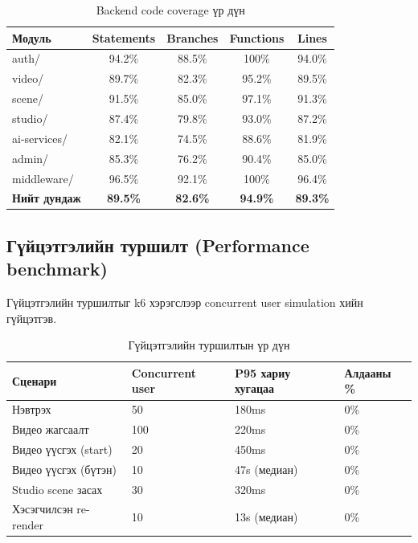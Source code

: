 \begin{table}[H]
\centering
\label{tab:coverage}
\begin{tabular}{|l|c|c|c|c|}
\hline
\textbf{Модуль} & \textbf{Statements} & \textbf{Branches} & \textbf{Functions} & \textbf{Lines} \\
\hline
auth/ & 94.2\% & 88.5\% & 100\% & 94.0\% \\
\hline
video/ & 89.7\% & 82.3\% & 95.2\% & 89.5\% \\
\hline
scene/ & 91.5\% & 85.0\% & 97.1\% & 91.3\% \\
\hline
studio/ & 87.4\% & 79.8\% & 93.0\% & 87.2\% \\
\hline
ai-services/ & 82.1\% & 74.5\% & 88.6\% & 81.9\% \\
\hline
admin/ & 85.3\% & 76.2\% & 90.4\% & 85.0\% \\
\hline
middleware/ & 96.5\% & 92.1\% & 100\% & 96.4\% \\
\hline
\textbf{Нийт дундаж} & \textbf{89.5\%} & \textbf{82.6\%} & \textbf{94.9\%} & \textbf{89.3\%} \\
\hline
\end{tabular}
\caption{Backend code coverage үр дүн}
\end{table}

\subsection{Гүйцэтгэлийн туршилт (Performance benchmark)}

Гүйцэтгэлийн туршилтыг k6 хэрэгслээр concurrent user simulation хийн гүйцэтгэв.

\begin{table}[H]
\centering
\label{tab:perf}
\small
\begin{tabular}{|p{3.8cm}|p{2cm}|p{2.8cm}|p{2cm}|}
\hline
\textbf{Сценари} & \textbf{Concurrent user} & \textbf{P95 хариу хугацаа} & \textbf{Алдааны \%} \\
\hline
Нэвтрэх & 50 & 180ms & 0\% \\
\hline
Видео жагсаалт & 100 & 220ms & 0\% \\
\hline
Видео үүсгэх (start) & 20 & 450ms & 0\% \\
\hline
Видео үүсгэх (бүтэн) & 10 & 47s (медиан) & 0\% \\
\hline
Studio scene засах & 30 & 320ms & 0\% \\
\hline
Хэсэгчилсэн re-render & 10 & 13s (медиан) & 0\% \\
\hline
\end{tabular}
\caption{Гүйцэтгэлийн туршилтын үр дүн}
\end{table}

